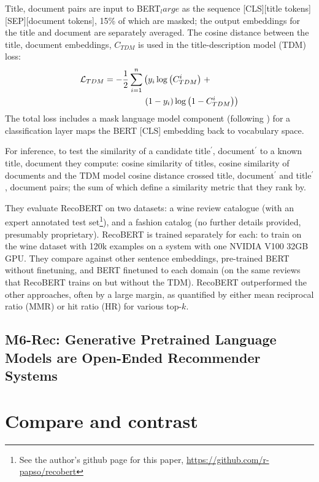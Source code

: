 \documentclass[11pt]{article}
\begin{document}
Title, document pairs are input to BERT$_large$ as the sequence [CLS][title tokens][SEP][document tokens], 15\% of which are masked; the output embeddings for the title and document are separately averaged. The cosine distance between the title, document embeddings, $C_{TDM}$ is used in the title-description model (TDM) loss:
\begin{align}
  \begin{split}
  \mathcal{L}_{TDM} = -{1 \over 2}\sum_{i=1}^n & \left(  y_i \log \left(C_{TDM}^i \right) \right. + \\
                                 &  \left. (1-y_i)\log \left( 1- C_{TDM}^i \right) \right)
  \end{split}
\end{align} 
The total loss includes a mask language model component (following \cite{Devlin2019}) for a classification layer maps the BERT [CLS] embedding back to vocabulary space.

For inference, to test the similarity of a candidate title$^\prime$, document$^\prime$ to a known title, document they compute: cosine similarity of titles, cosine similarity of documents and the TDM model cosine distance crossed title, document$^\prime$ and title$^\prime$, document pairs; the sum of which define a similarity metric that they rank by.

They evaluate RecoBERT on two datasets: a wine review catalogue \cite{kagglewine} (with an expert annotated test set\footnote[1]{See the author's github page for this paper, \url{https://github.com/r-papso/recobert}}), and a fashion catalog (no further details provided, presumably proprietary). RecoBERT is trained separately for each: to train on the wine dataset with 120k examples on a system with one NVIDIA V100 32GB GPU. They compare against other sentence embeddings, pre-trained BERT without finetuning, and BERT finetuned to each domain (on the same reviews that RecoBERT trains on but without the TDM). RecoBERT outperformed the other approaches, often by a large margin, as quantified by either mean reciprocal ratio (MMR) or hit ratio (HR) for various top-$k$. 


\subsection{M6-Rec: Generative Pretrained Language Models are Open-Ended Recommender Systems \cite{Cui2022}}



\section{Compare and contrast} 
\end{document}
